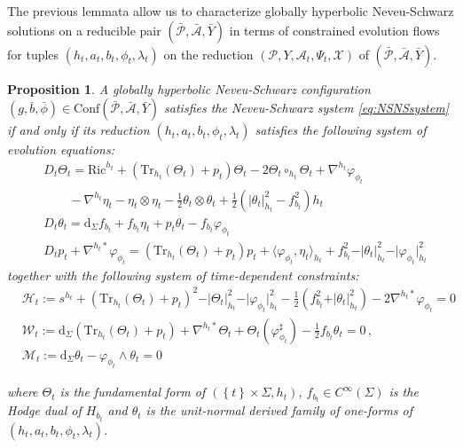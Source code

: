 \documentclass[10pt,reqno,a4paper]{amsart}
\theoremstyle{plain}
\newtheorem{prop}[thm]{Proposition}
\theoremstyle{definition}
\theoremstyle{remark}
\theoremstyle{remark}
\def\dd{\mathrm{d}}
\def\Conf{\mathrm{Conf}}
\newcommand{\Tr}{\mathrm{Tr}}
\def\cH{\mathcal{H}}
\def\cA{\mathcal{A}}
\def\cP{\mathcal{P}}
\def\cX{\mathcal{X}}
\def\cH{\mathcal{H}}
\newcommand{\Ric}{\mathrm{Ric}}
\renewcommand{\(}{ (}
\renewcommand{\)}{ )}
\begin{document}
\noindent
The previous lemmata allow us to characterize globally hyperbolic Neveu-Schwarz solutions on a reducible pair $(\bar{\cP},\bar{\cA},\bar{Y})$ in terms of constrained evolution flows for tuples $( h_t , a_t , b_t , \phi_t,\lambda_t)$ on the reduction $(\cP,Y,\cA_t,\Psi_t,\cX)$ of $(\bar{\cP},\bar{\cA},\bar{Y})$.
\begin{prop}
\label{prop:normalhyperbolicflow}
A globally hyperbolic Neveu-Schwarz configuration $(g,\bar{b},\bar{\phi})\in \Conf(\bar{\cP},\bar{\cA},\bar{Y})$ satisfies the Neveu-Schwarz system \eqref{eq:NSNSsystem} if and only if its reduction $( h_t , a_t , b_t , \phi_t,\lambda_t)$ satisfies the following system of evolution equations:
\begin{eqnarray}
& D_t \Theta_t = \Ric^{h_t} + (\Tr_{h_t}(\Theta_t) + p_t) \Theta_t - 2 \Theta_t\circ_{h_t} \Theta_t + \nabla^{h_t} \varphi_{\phi_t} \nonumber \\
& \qquad -\nabla^{h_t}\eta_t-\eta_t\otimes\eta_t - \frac{1}{2} \theta_t \otimes \theta_t + \frac{1}{2} (\vert \theta_t\vert_{h_t}^2 - f_{b_t}^2) h_t \nonumber \\
& D_t \theta_t = \dd_{\Sigma} f_{b_t}+f_{b_t}\eta_t+p_t\theta_t-f_{b_t}\varphi_{\phi_t} \label{eq:normalevolution} \\
& D_tp_t + \nabla^{h_t\ast}\varphi_{\phi_t} = (\Tr_{h_t}(\Theta_t) + p_t)p_t+\langle\varphi_{\phi_t},\eta_t\rangle_{h_t}+f_{b_t}^2-\vert\theta_t\vert_{h_t}^2-\vert\varphi_{\phi_t}\vert_{h_t}^2 \nonumber
\end{eqnarray}
together with the following system of time-dependent constraints:
\begin{eqnarray}
& \cH_t := s^{h_t}  + (\Tr_{h_t}(\Theta_t) + p_t)^2 - \vert\Theta_t\vert^2_{h_t} - \vert\varphi_{\phi_t}\vert_{h_t}^2 - \frac{1}{2}( f_{b_t}^2 + \vert \theta_t \vert^2_{h_t} ) - 2 \nabla^{h_t\ast}\varphi_{\phi_t} = 0 \nonumber \\
&  \mathcal{W}_t := \dd_{\Sigma}(\Tr_{h_t}(\Theta_t)+p_t) + \nabla^{h_t\ast}\Theta_t+\Theta_t(\varphi_{\phi_t}^{\sharp})-\frac{1}{2}f_{b_t}\theta_t = 0\, , \label{eq:normalconstraint}\\
& \mathcal{M}_t := \dd_{\Sigma} \theta_t -\varphi_{\phi_t} \wedge \theta_t = 0 \nonumber
\end{eqnarray}

\noindent
where $\Theta_t$ is the fundamental form of $(\left\{ t\right\} \times \Sigma, h_t)$, $f_{b_t}\in C^{\infty}(\Sigma)$ is the Hodge dual of $H_{b_t}$ and $\theta_t$ is the unit-normal derived family of one-forms of $( h_t , a_t , b_t , \phi_t,\lambda_t)$. 
\end{prop}  
\end{document}
